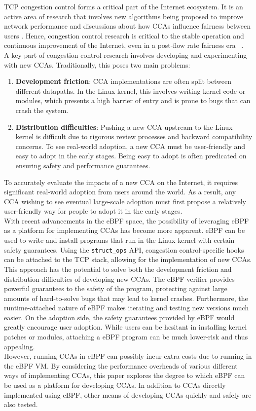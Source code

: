 \documentclass[../main.tex]{subfiles}
\begin{document}
TCP congestion control forms a critical part of the Internet ecosystem. It is an active area of research that involves new algorithms being proposed to improve network performance \cite{CCA-BBR, CCA-FCC} and discussions about how CCAs influence fairness between users \cite{CCAStarvation, CCA-Fairness}. Hence, congestion control research is critical to the stable operation and continuous improvement of the Internet, even in a post-flow rate fairness era ~\cite{PrinciplesForCongestionManagement, Dismantling}.\\
A key part of congestion control research involves developing and experimenting with new CCAs. Traditionally, this poses two main problems:
\begin{enumerate}
    \item {\bf Development friction}: CCA implementations are often split between different datapaths. In the Linux kernel, this involves writing kernel code or modules, which presents a high barrier of entry and is prone to bugs that can crash the system.
    \item {\bf Distribution difficulties}: Pushing a new CCA upstream to the Linux kernel is difficult due to rigorous review processes and backward compatibility concerns. To see real-world adoption, a new CCA must be user-friendly and easy to adopt in the early stages. Being easy to adopt is often predicated on ensuring safety and performance guarantees.
\end{enumerate}
To accurately evaluate the impacts of a new CCA on the Internet, it requires significant real-world adoption from users around the world. As a result, any CCA wishing to see eventual large-scale adoption must first propose a relatively user-friendly way for people to adopt it in the early stages. \\
With recent advancements in the eBPF space, the possibility of leveraging eBPF as a platform for implementing CCAs has become more apparent. eBPF \cite{ebpf} can be used to write and install programs that run in the Linux kernel with certain safety guarantees. Using the \texttt{struct\_ops} API, congestion control-specific hooks can be attached to the TCP stack, allowing for the implementation of new CCAs. This approach has the potential to solve both the development friction and distribution difficulties of developing new CCAs. The eBPF verifier provides powerful guarantees to the safety of the program, protecting against large amounts of hard-to-solve bugs that may lead to kernel crashes. Furthermore, the runtime-attached nature of eBPF makes iterating and testing new versions much easier. On the adoption side, the safety guarantees provided by eBPF would greatly encourage user adoption. While users can be hesitant in installing kernel patches or modules, attaching a eBPF program can be much lower-risk and thus appealing. \\
However, running CCAs in eBPF can possibly incur extra costs due to running in the eBPF VM. By considering the performance overheads of various different ways of implementing CCAs, this paper explores the degree to which eBPF can be used as a platform for developing CCAs. In addition to CCAs directly implemented using eBPF, other means of developing CCAs quickly and safely are also tested.
\end{document}
